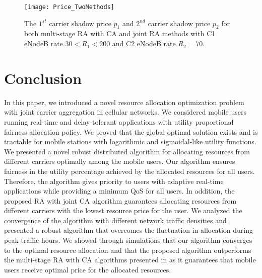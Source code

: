 \documentclass[journal]{IEEEtran} 		\usepackage{amsmath,amssymb}
\begin{document}
\begin{figure}[tb]
\centering
\texttt{[image: Price\_TwoMethods]}
\caption{The $1^{st}$ carrier shadow price $p_1$ and $2^{nd}$ carrier shadow price $p_2$ for both multi-stage RA with CA and joint RA methods with C1 eNodeB rate $30<R_1<200$ and C2 eNodeB rate $R_2=70$.}
\label{fig:Price_TwoMethods}
\end{figure}

\section{Conclusion}\label{sec:conclude}
In this paper, we introduced a novel resource allocation optimization problem with joint carrier aggregation in cellular networks. We considered mobile users running real-time and delay-tolerant applications with utility proportional fairness allocation policy. We proved that the global optimal solution exists and is tractable for mobile stations with logarithmic and sigmoidal-like utility functions. We presented a novel robust distributed algorithm for allocating resources from different carriers optimally among the mobile users. Our algorithm ensures fairness in the utility percentage achieved by the allocated resources for all users. Therefore, the algorithm gives priority to users with adaptive real-time applications while providing a minimum QoS for all users. In addition, the proposed RA with joint CA algorithm guarantees allocating resources from different carriers with the lowest resource price for the user. We analyzed the convergence of the algorithm with different network traffic densities and
presented a robust algorithm that overcomes the fluctuation in allocation during peak traffic hours. We showed through simulations that our algorithm converges to the optimal resource allocation and that the proposed algorithm outperforms the multi-stage RA with CA algorithms presented in \cite{Haya_Utility1,Haya_Utility3,Haya_Utility6} as it guarantees that mobile users receive optimal price for the allocated resources.



\end{document}
